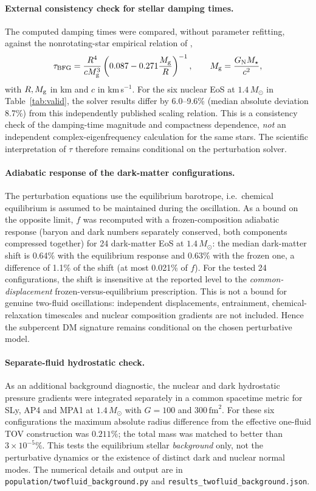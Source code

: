 \documentclass[11pt,a4paper]{article}
\newcommand{\Msun}{M_\odot}
\begin{document}
\paragraph{External consistency check for stellar damping times.}
The computed damping times were compared, without parameter refitting, against the nonrotating-star empirical relation of \citet{Benhar04},
\begin{equation}
\tau_{\rm BFG}=\frac{R^4}{cM_{\rm g}^3}
\left(0.087-0.271\frac{M_{\rm g}}{R}\right)^{-1},
\qquad M_{\rm g}=\frac{G_{\rm N}M_\star}{c^2},
\end{equation}
with $R,M_{\rm g}$ in km and $c$ in km\,s$^{-1}$. For the six nuclear EoS at $1.4\,\Msun$ in Table~\ref{tab:valid}, the solver results differ by 6.0--9.6\% (median absolute deviation 8.7\%) from this independently published scaling relation. This is a consistency check of the damping-time magnitude and compactness dependence, \emph{not} an independent complex-eigenfrequency calculation for the same stars. The scientific interpretation of $\tau$ therefore remains conditional on the perturbation solver.

\paragraph{Adiabatic response of the dark-matter configurations.} The perturbation equations use the equilibrium barotrope, i.e.\ chemical equilibrium is assumed to be maintained during the oscillation. As a bound on the opposite limit, $f$ was recomputed with a frozen-composition adiabatic response (baryon and dark numbers separately conserved, both components compressed together) for 24 dark-matter EoS at $1.4\,\Msun$: the median dark-matter shift is 0.64\% with the equilibrium response and 0.63\% with the frozen one, a difference of 1.1\% of the shift (at most 0.021\% of $f$). For the tested 24 configurations, the shift is insensitive at the reported level to the \emph{common-displacement} frozen-versus-equilibrium prescription. This is not a bound for genuine two-fluid oscillations: independent displacements, entrainment, chemical-relaxation timescales and nuclear composition gradients are not included. Hence the subpercent DM signature remains conditional on the chosen perturbative model.
\paragraph{Separate-fluid hydrostatic check.} As an additional background diagnostic, the nuclear and dark hydrostatic pressure gradients were integrated separately in a common spacetime metric for SLy, AP4 and MPA1 at $1.4\,\Msun$ with $G=100$ and $300\,\mathrm{fm}^2$. For these six configurations the maximum absolute radius difference from the effective one-fluid TOV construction was $0.211\%$; the total mass was matched to better than $3\times10^{-5}\%$. This tests the equilibrium stellar \emph{background} only, not the perturbative dynamics or the existence of distinct dark and nuclear normal modes. The numerical details and output are in \texttt{population/twofluid\_background.py} and \texttt{results\_twofluid\_background.json}.\par
\end{document}
